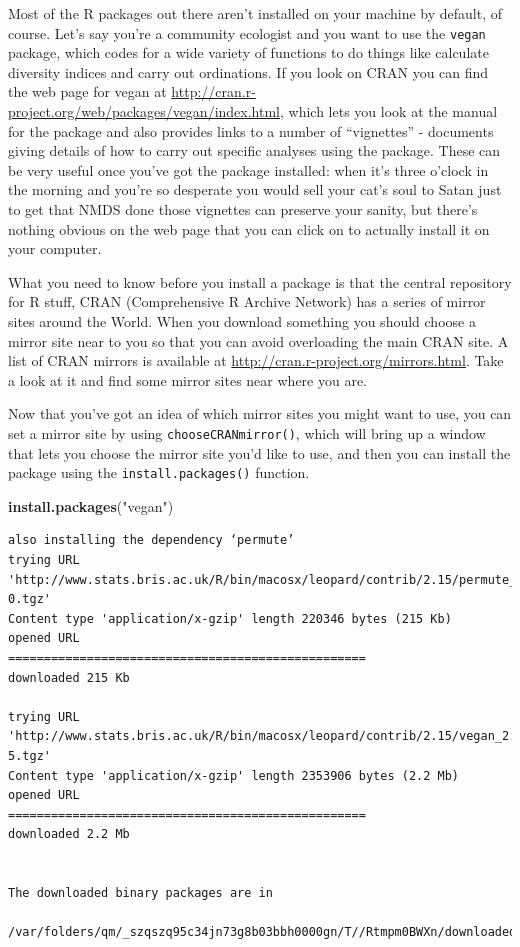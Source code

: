 \documentclass[
]{book}
\newenvironment{Shaded}{\begin{snugshade}}{\end{snugshade}}
\newcommand{\KeywordTok}[1]{\textcolor[rgb]{0.13,0.29,0.53}{\textbf{#1}}}
\newcommand{\NormalTok}[1]{#1}
\newcommand{\StringTok}[1]{\textcolor[rgb]{0.31,0.60,0.02}{#1}}
\begin{document}
Most of the R packages out there aren't installed on your machine by default, of course. Let's say you're a community ecologist and you want to use the \texttt{vegan} package, which codes for a wide variety of functions to do things like calculate diversity indices and carry out ordinations. If you look on CRAN you can find the web page for vegan at \url{http://cran.r-project.org/web/packages/vegan/index.html}, which lets you look at the manual for the package and also provides links to a number of ``vignettes'' - documents giving details of how to carry out specific analyses using the package. These can be very useful once you've got the package installed: when it's three o'clock in the morning and you're so desperate you would sell your cat's soul to Satan just to get that NMDS done those vignettes can preserve your sanity, but there's nothing obvious on the web page that you can click on to actually install it on your computer.

What you need to know before you install a package is that the central repository for R stuff, CRAN (Comprehensive R Archive Network) has a series of mirror sites around the World. When you download something you should choose a mirror site near to you so that you can avoid overloading the main CRAN site. A list of CRAN mirrors is available at \url{http://cran.r-project.org/mirrors.html}. Take a look at it and find some mirror sites near where you are.

Now that you've got an idea of which mirror sites you might want to use, you can set a mirror site by using \texttt{chooseCRANmirror()}, which will bring up a window that lets you choose the mirror site you'd like to use, and then you can install the package using the \texttt{install.packages()} function.

\begin{Shaded}
\begin{Highlighting}[]
\KeywordTok{install.packages}\NormalTok{(}\StringTok{"vegan"}\NormalTok{)}
\end{Highlighting}
\end{Shaded}

\begin{verbatim}
also installing the dependency ‘permute’
trying URL 'http://www.stats.bris.ac.uk/R/bin/macosx/leopard/contrib/2.15/permute_0.7-0.tgz'
Content type 'application/x-gzip' length 220346 bytes (215 Kb)
opened URL
==================================================
downloaded 215 Kb

trying URL 'http://www.stats.bris.ac.uk/R/bin/macosx/leopard/contrib/2.15/vegan_2.0-5.tgz'
Content type 'application/x-gzip' length 2353906 bytes (2.2 Mb)
opened URL
==================================================
downloaded 2.2 Mb


The downloaded binary packages are in
  /var/folders/qm/_szqszq95c34jn73g8b03bbh0000gn/T//Rtmpm0BWXn/downloaded_packages
\end{verbatim}
\end{document}
